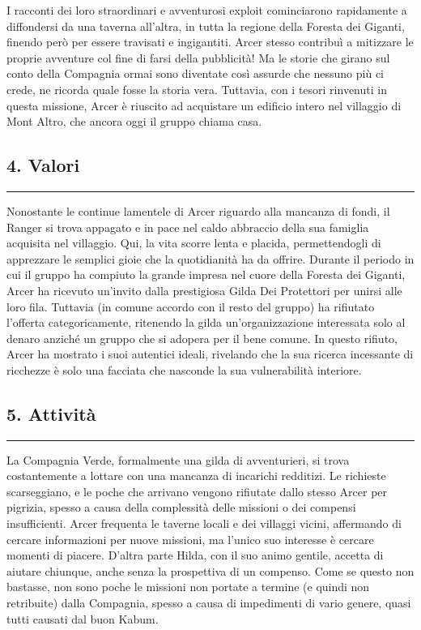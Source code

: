 I racconti dei loro straordinari e avventurosi exploit cominciarono
rapidamente a diffondersi da una taverna all'altra, in tutta la regione
della Foresta dei Giganti, finendo però per essere travisati e
ingigantiti. Arcer stesso contribuì a mitizzare le proprie avventure col
fine di farsi della pubblicità! Ma le storie che girano sul conto della
Compagnia ormai sono diventate così assurde che nessuno più ci crede, ne
ricorda quale fosse la storia vera. Tuttavia, con i tesori rinvenuti in
questa missione, Arcer è riuscito ad acquistare un edificio intero nel
villaggio di Mont Altro, che ancora oggi il gruppo chiama casa.

\subsection{4. Valori}\label{valori}

\begin{center}\rule{0.5\linewidth}{0.5pt}\end{center}

Nonostante le continue lamentele di Arcer riguardo alla mancanza di
fondi, il Ranger si trova appagato e in pace nel caldo abbraccio della
sua famiglia acquisita nel villaggio. Qui, la vita scorre lenta e
placida, permettendogli di apprezzare le semplici gioie che la
quotidianità ha da offrire. Durante il periodo in cui il gruppo ha
compiuto la grande impresa nel cuore della Foresta dei Giganti, Arcer ha
ricevuto un'invito dalla prestigiosa Gilda Dei Protettori per unirsi
alle loro fila. Tuttavia (in comune accordo con il resto del gruppo) ha
rifiutato l'offerta categoricamente, ritenendo la gilda
un'organizzazione interessata solo al denaro anziché un gruppo che si
adopera per il bene comune. In questo rifiuto, Arcer ha mostrato i suoi
autentici ideali, rivelando che la sua ricerca incessante di ricchezze è
solo una facciata che nasconde la sua vulnerabilità interiore.

\subsection{5. Attività}\label{attivituxe0}

\begin{center}\rule{0.5\linewidth}{0.5pt}\end{center}

La Compagnia Verde, formalmente una gilda di avventurieri, si trova
costantemente a lottare con una mancanza di incarichi redditizi. Le
richieste scarseggiano, e le poche che arrivano vengono rifiutate dallo
stesso Arcer per pigrizia, spesso a causa della complessità delle
missioni o dei compensi insufficienti. Arcer frequenta le taverne locali
e dei villaggi vicini, affermando di cercare informazioni per nuove
missioni, ma l'unico suo interesse è cercare momenti di piacere. D'altra
parte Hilda, con il suo animo gentile, accetta di aiutare chiunque,
anche senza la prospettiva di un compenso. Come se questo non bastasse,
non sono poche le missioni non portate a termine (e quindi non
retribuite) dalla Compagnia, spesso a causa di impedimenti di vario
genere, quasi tutti causati dal buon Kabum.


